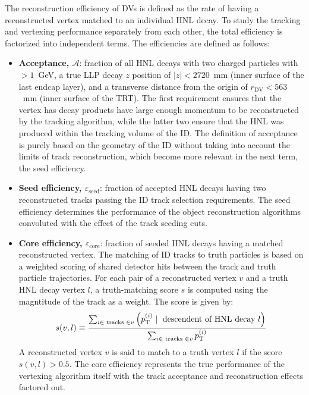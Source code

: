 The reconstruction efficiency of DVs is defined as the rate of having a reconstructed vertex matched to an individual HNL decay. To study the tracking and vertexing performance separately from each other, the total efficiency is factorized into independent terms. The efficiencies are defined as follows:
\begin{itemize}
    \item \textbf{Acceptance, $\mathcal{A}$}: fraction of all HNL decays with two charged particles with \pT $>1$~GeV, a true LLP decay $z$ position of $|z|<2720$~mm (inner surface of the last endcap layer), and a transverse distance from the origin of $r_\mathrm{DV}<563$~mm (inner surface of the TRT). The first requirement ensures that the vertex has decay products have large enough momentum to be reconstructed by the tracking algorithm, while the latter two ensure that the HNL was produced within the tracking volume of the ID. The definition of acceptance is purely based on the geometry of the ID without taking into account the limits of track reconstruction, which become more relevant in the next term, the seed efficiency.
    \item \textbf{Seed efficiency, $\varepsilon_\mathrm{seed}$}: fraction of accepted HNL decays having two reconstructed tracks passing the ID track selection requirements. The seed efficiency determines the performance of the object reconstruction algorithms convoluted with the effect of the track seeding cuts.
    \item \textbf{Core efficiency, $\varepsilon_\mathrm{core}$}: fraction of seeded HNL decays having a matched reconstructed vertex.
    The matching of ID tracks to truth particles is based on a weighted scoring of shared detector hits between the track and truth particle trajectories. For each pair of a reconstructed vertex $v$ and a truth HNL decay vertex $l$, a truth-matching score $s$ is computed using the magntitude of the track \pT as a weight. The score is given by:
    \begin{equation}
        s(v, l) \equiv \frac{\sum_{i \in \text { tracks } \in v}\left(p_\mathrm{T}^{(i)} \mid \text { descendent of HNL decay } l\right)}{\sum_{i \in \text { tracks } \in v} p_\mathrm{T}^{(i)}}
    \end{equation}
    A reconstructed vertex $v$ is said to match to a truth vertex $l$ if the score $s(v,l)>0.5$. The core efficiency represents the true performance of the vertexing algorithm itself with the track acceptance and reconstruction effects factored out.
\end{itemize}


